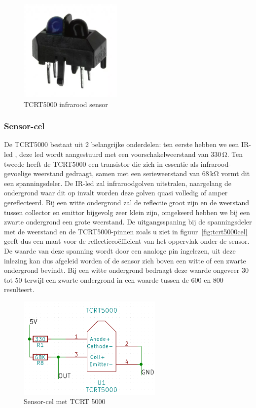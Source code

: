 \begin{figure}[H]
	\centering
	\includegraphics[height=5cm]{tcrt5000.png}
	\caption{TCRT5000 infrarood sensor\label{fig:tcrt5000}}
\end{figure}

\subsubsection*{Sensor-cel}
De TCRT5000 bestaat uit 2 belangrijke onderdelen: ten eerste hebben we een IR-led , deze led wordt aangestuurd met een voorschakelweerstand van $330\,\mathrm{\Omega}$. Ten tweede heeft de TCRT5000 een transistor die zich in essentie als infrarood-gevoelige weerstand gedraagt, samen met een serieweerstand van $68\,\mathrm{k\Omega}$ vormt dit een spanningsdeler. De IR-led zal infraroodgolven uitstralen, naargelang de ondergrond waar dit op invalt worden deze golven quasi volledig of amper gereflecteerd. Bij een witte ondergrond zal de reflectie groot zijn en de weerstand tussen collector en emittor bijgevolg zeer klein zijn, omgekeerd hebben we bij een zwarte ondergrond een grote weerstand. De uitgangsspaning bij de spanningsdeler met de weerstand en de TCRT5000-pinnen zoals u ziet in figuur~\vref{fig:tcrt5000cel} geeft dus een maat voor de reflectieco\"efficient van het oppervlak onder de sensor. De waarde van deze spanning wordt door een analoge pin ingelezen, uit deze inlezing kan dus afgeleid worden of de sensor zich boven een witte of een zwarte ondergrond bevindt. Bij een witte ondergrond bedraagt deze waarde ongeveer $30$ tot $50$ terwijl een zwarte ondergrond in een waarde tussen de $600$ en $800$ resulteert.

\begin{figure}[H]
	\centering
	\includegraphics[height=5cm]{tcrt5000cel.png}
	\caption{Sensor-cel met TCRT 5000\label{fig:tcrt5000cel}}
\end{figure}

